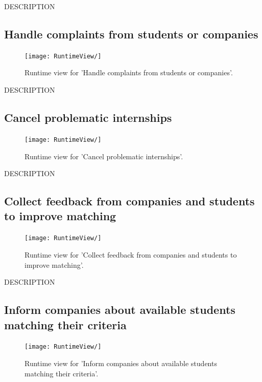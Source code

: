 DESCRIPTION


\subsection{Handle complaints from students or companies}
\begin{figure}[H]
    \begin{center}
        \texttt{[image: RuntimeView/]}
        \caption{Runtime view for 'Handle complaints from students or companies'.}
        \label{fig:runtime_modifybadge}%
    \end{center}
\end{figure}

DESCRIPTION


\subsection{Cancel problematic internships}
\begin{figure}[H]
    \begin{center}
        \texttt{[image: RuntimeView/]}
        \caption{Runtime view for 'Cancel problematic internships'.}
        \label{fig:runtime_modifybadge}%
    \end{center}
\end{figure}

DESCRIPTION


\subsection{Collect feedback from companies and students to improve matching}
\begin{figure}[H]
    \begin{center}
        \texttt{[image: RuntimeView/]}
        \caption{Runtime view for 'Collect feedback from companies and students to improve matching'.}
        \label{fig:runtime_modifybadge}%
    \end{center}
\end{figure}

DESCRIPTION


\subsection{Inform companies about available students matching their criteria}
\begin{figure}[H]
    \begin{center}
        \texttt{[image: RuntimeView/]}
        \caption{Runtime view for 'Inform companies about available students matching their criteria'.}
        \label{fig:runtime_modifybadge}%
    \end{center}
\end{figure}

